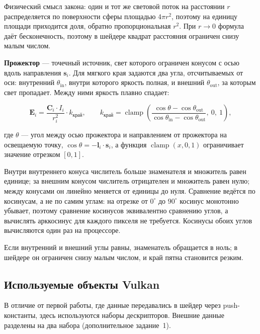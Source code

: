 \documentclass[14pt,a4paper]{extarticle}
\begin{document}
Физический смысл закона: один и тот же световой поток на расстоянии $r$
распределяется по поверхности сферы площадью $4\pi r^2$, поэтому на единицу
площади приходится доля, обратно пропорциональная $r^2$. При $r \to 0$ формула
даёт бесконечность, поэтому в шейдере квадрат расстояния ограничен снизу
малым числом.

\textbf{Прожектор} — точечный источник, свет которого ограничен конусом с осью
вдоль направления $\mathbf{s}_i$. Для мягкого края задаются два угла,
отсчитываемых от оси: внутренний $\theta_{\text{in}}$, внутри которого яркость
полная, и внешний $\theta_{\text{out}}$, за которым свет пропадает. Между ними
яркость плавно спадает:

\begin{equation}
	\mathbf{E}_i = \frac{\mathbf{C}_i \cdot I_i}{r_i^2} \cdot k_{\text{край}},
	\qquad
	k_{\text{край}} = \operatorname{clamp}\!\left(
		\frac{\cos\theta - \cos\theta_{\text{out}}}
		     {\cos\theta_{\text{in}} - \cos\theta_{\text{out}}},\ 0,\ 1
	\right),
	\label{eq:spot}
\end{equation}

где $\theta$ — угол между осью прожектора и направлением от прожектора на
освещаемую точку, $\cos\theta = -\mathbf{l}_i \cdot \mathbf{s}_i$, а функция
$\operatorname{clamp}(x, 0, 1)$ ограничивает значение отрезком $[0, 1]$.

Внутри внутреннего конуса числитель больше знаменателя и множитель равен
единице; за внешним конусом числитель отрицателен и множитель равен нулю; между
конусами он линейно меняется от единицы до нуля. Сравнение ведётся по
косинусам, а не по самим углам: на отрезке от $0^\circ$ до $90^\circ$ косинус
монотонно убывает, поэтому сравнение косинусов эквивалентно сравнению углов, а
вычислять арккосинус для каждого пикселя не требуется. Косинусы обоих углов
вычисляются один раз на процессоре.

Если внутренний и внешний углы равны, знаменатель обращается в ноль; в шейдере
он ограничен снизу малым числом, и край пятна становится резким.

\subsection{Используемые объекты Vulkan}

В отличие от первой работы, где данные передавались в шейдер через
push-константы, здесь используются наборы дескрипторов. Внешние данные
разделены на два набора (дополнительное задание~1).
\end{document}
